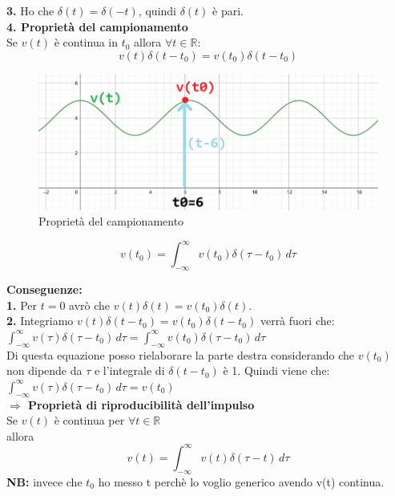 	\textbf{3. } Ho che $ \delta(t)=\delta(-t) $, quindi $ \delta(t) $ è pari.\\
	
	\textbf{4. Proprietà del campionamento}\\
	Se $ v(t) $ è continua in $ t_0 $ allora $ \forall t \in \mathbb{R}$:
	\begin{equation*}
	v(t) \delta (t-t_0) = v(t_0) \delta (t-t_0)
	\end{equation*}
	
	\begin{figure}[h]
		\centering
		\includegraphics[scale=0.5]{immagini/campionamento}
		\caption{ Proprietà del campionamento }
		\label{fig: campionamento}
	\end{figure}

	\begin{equation*}
	v(t_0) = \int_{ - \infty}^{ \infty} v(t_0) \delta( \tau -t_0)  \, d\tau
	\end{equation*}
	
	\textbf{Conseguenze: }\\
	
	\textbf{1. } Per $ t=0 $ avrò che $ v(t) \delta (t) = v(t_0) \delta (t) $.\\
	
	\textbf{2. } Integriamo $ v(t) \delta (t-t_0) = v(t_0) \delta (t-t_0) $ verrà fuori che:\\
	$ \int_{ - \infty}^{ \infty} v( \tau ) \delta( \tau -t_0)  \, d\tau = \int_{ - \infty}^{ \infty} v( t_0 ) \delta( \tau -t_0)  \, d\tau$\\
	Di questa equazione posso rielaborare la parte destra considerando che $ v(t_0)$ non dipende da $ \tau $ e l'integrale di $ \delta (t-t_0) $ è 1. Quindi viene che:\\
	$ \int_{ - \infty}^{ \infty} v( \tau ) \delta( \tau -t_0)  \, d\tau = v(t_0)$\\
	
	\textbf{ $ \Rightarrow $ Proprietà di riproducibilità dell'impulso }\\
	Se $ v(t)$ è continua per $ \forall t \in \mathbb{R} $\\
	allora
	\begin{equation*}
	v(t) = \int_{ - \infty}^{ \infty} v( t ) \delta( \tau -t)  \, d \tau
	\end{equation*}
	\textbf{NB:} invece che $ t_0$ ho messo t perchè lo voglio generico avendo v(t) continua.\\
	
